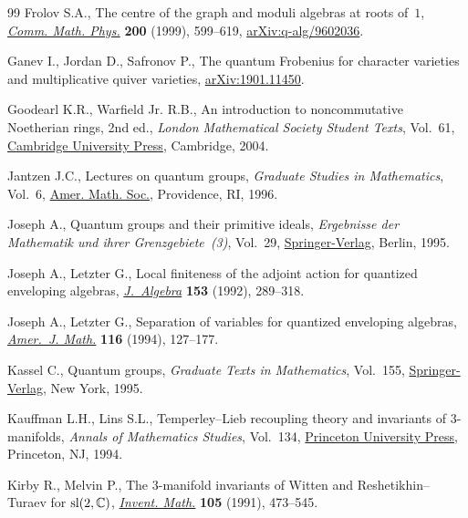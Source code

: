 \documentclass[pdftex]{sigma}%
\numberwithin{equation}{section}
\numberwithin{figure}{section}
\begin{document}
\begin{thebibliography}{99}
Frolov S.A., The centre of the graph and moduli algebras at roots of~{$1$},
 \href{https://doi.org/10.1007/s002200050542}{\textit{Comm. Math. Phys.}} \textbf{200} (1999), 599--619,
 \href{https://arxiv.org/abs/q-alg/9602036}{arXiv:q-alg/9602036}.

Ganev I., Jordan D., Safronov P., The quantum {F}robenius for character
 varieties and multiplicative quiver varieties, \href{https://arxiv.org/abs/1901.11450}{arXiv:1901.11450}.

Goodearl K.R., Warfield Jr. R.B., An introduction to noncommutative
 {N}oetherian rings, 2nd ed., \textit{London Mathematical Society Student Texts},
 Vol.~61, \href{https://doi.org/10.1017/CBO9780511841699}{Cambridge University Press}, Cambridge, 2004.

Jantzen J.C., Lectures on quantum groups, \textit{Graduate Studies in
 Mathematics}, Vol.~6, \href{https://doi.org/10.1090/gsm/006}{Amer. Math. Soc.}, Providence, RI, 1996.

Joseph A., Quantum groups and their primitive ideals, \textit{Ergebnisse der
 Mathematik und ihrer Grenzgebiete~(3)}, Vol.~29, \href{https://doi.org/10.1007/978-3-642-78400-2}{Springer-Verlag}, Berlin,
 1995.

Joseph A., Letzter G., Local finiteness of the adjoint action for quantized
 enveloping algebras, \href{https://doi.org/10.1016/0021-8693(92)90157-H}{\textit{J.~Algebra}} \textbf{153} (1992), 289--318.

Joseph A., Letzter G., Separation of variables for quantized enveloping
 algebras, \href{https://doi.org/10.2307/2374984}{\textit{Amer.~J. Math.}} \textbf{116} (1994), 127--177.

Kassel C., Quantum groups, \textit{Graduate Texts in Mathematics}, Vol.~155,
 \href{https://doi.org/10.1007/978-1-4612-0783-2}{Springer-Verlag}, New York, 1995.

Kauffman L.H., Lins S.L., Temperley--{L}ieb recoupling theory and invariants of
 {$3$}-manifolds, \textit{Annals of Mathematics Studies}, Vol.~134, \href{https://doi.org/10.1515/9781400882533}{Princeton
 University Press}, Princeton, NJ, 1994.

Kirby R., Melvin P., The {$3$}-manifold invariants of {W}itten and
 {R}eshetikhin--{T}uraev for {${\rm sl}(2,{\mathbb C})$}, \href{https://doi.org/10.1007/BF01232277}{\textit{Invent.
 Math.}} \textbf{105} (1991), 473--545.


\end{thebibliography}
\end{document}
